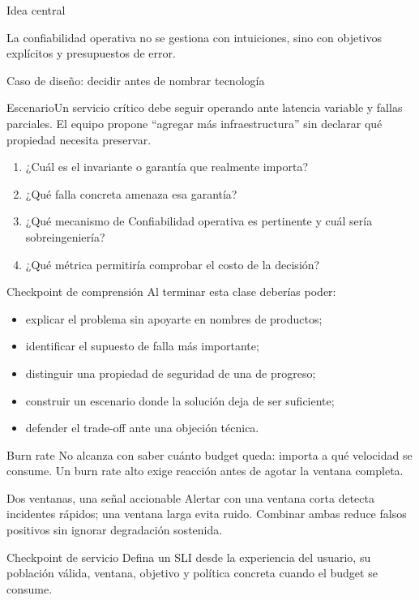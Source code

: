 \documentclass[institutional,screen,none]{ua-engineering-v6-beamer}
\begin{document}

\begin{frame}{Idea central}
\begin{block}{}
La confiabilidad operativa no se gestiona con intuiciones, sino con objetivos explícitos y presupuestos de error.
\end{block}
\end{frame}


\begin{frame}{Caso de diseño: decidir antes de nombrar tecnología}
\small
\begin{block}{Escenario}Un servicio crítico debe seguir operando ante latencia variable y fallas parciales. El equipo propone ``agregar más infraestructura'' sin declarar qué propiedad necesita preservar.\end{block}
\begin{enumerate}
\item ¿Cuál es el invariante o garantía que realmente importa?
\item ¿Qué falla concreta amenaza esa garantía?
\item ¿Qué mecanismo de Confiabilidad operativa es pertinente y cuál sería sobreingeniería?
\item ¿Qué métrica permitiría comprobar el costo de la decisión?
\end{enumerate}
\end{frame}
\begin{frame}{Checkpoint de comprensión}
\small
Al terminar esta clase deberías poder:
\begin{itemize}
\item explicar el problema sin apoyarte en nombres de productos;
\item identificar el supuesto de falla más importante;
\item distinguir una propiedad de seguridad de una de progreso;
\item construir un escenario donde la solución deja de ser suficiente;
\item defender el trade-off ante una objeción técnica.
\end{itemize}
\end{frame}

\begin{frame}{Burn rate}
No alcanza con saber cuánto budget queda: importa a qué velocidad se consume. Un burn rate alto exige reacción antes de agotar la ventana completa.
\end{frame}
\begin{frame}{Dos ventanas, una señal accionable}
Alertar con una ventana corta detecta incidentes rápidos; una ventana larga evita ruido. Combinar ambas reduce falsos positivos sin ignorar degradación sostenida.
\end{frame}
\begin{frame}{Checkpoint de servicio}
Defina un SLI desde la experiencia del usuario, su población válida, ventana, objetivo y política concreta cuando el budget se consume.
\end{frame}
\end{document}
